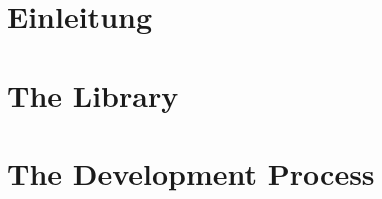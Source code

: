 



\cleardoublepage %

\cleardoublepage %

\pagestyle{scrheadings} %

\cleardoublepage %


\cleardoublepage %


\part{Einleitung}



\cleardoublepage %


\part{The Library}

%
%
%


\part{The Development Process}

